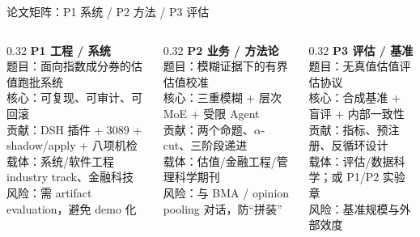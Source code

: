 \documentclass[final]{beamer}
\newcommand{\kw}[1]{\textcolor{csred}{\textbf{#1}}}
\begin{document}
\begin{frame}[t]
\begin{block}{论文矩阵：P1 系统 / P2 方法 / P3 评估}
{\fontsize{21}{26}\selectfont
\begin{columns}[t,onlytextwidth]
\begin{column}{0.32\textwidth}
\kw{P1 工程 / 系统}\\[1mm]
题目：面向指数成分券的估值跑批系统\\
核心：可复现、可审计、可回滚\\
贡献：DSH 插件 + 3089 + shadow/apply + 八项机检\\
载体：系统/软件工程 industry track、金融科技\\
风险：需 artifact evaluation，避免 demo 化
\end{column}
\begin{column}{0.32\textwidth}
\kw{P2 业务 / 方法论}\\[1mm]
题目：模糊证据下的有界估值校准\\
核心：三重模糊 + 层次 MoE + 受限 Agent\\
贡献：两个命题、$\alpha$-cut、三阶段递进\\
载体：估值/金融工程/管理科学期刊\\
风险：与 BMA / opinion pooling 对话，防“拼装”
\end{column}
\begin{column}{0.32\textwidth}
\kw{P3 评估 / 基准}\\[1mm]
题目：无真值估值评估协议\\
核心：合成基准 + 盲评 + 内部一致性\\
贡献：指标、预注册、反循环设计\\
载体：评估/数据科学；或 P1/P2 实验章\\
风险：基准规模与外部效度
\end{column}
\end{columns}}


\end{block}
\end{frame}
\end{document}
